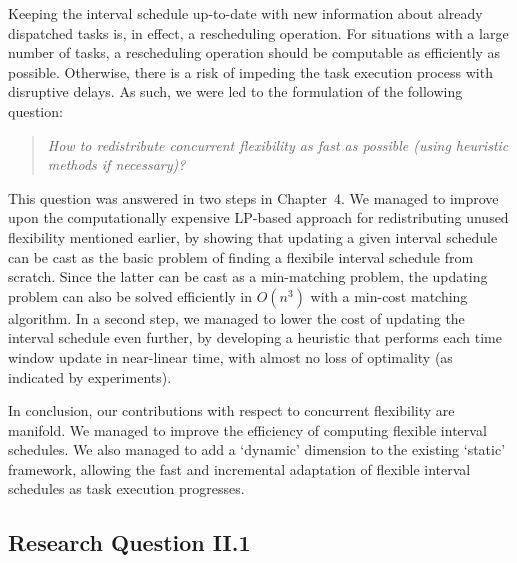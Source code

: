 	Keeping the interval schedule up-to-date with new information about already dispatched tasks is, in effect, a rescheduling operation.
	For situations with a large number of tasks, 
	a rescheduling operation should be computable as efficiently as possible.
	Otherwise, there is a risk of impeding the task execution process with disruptive delays.
	As such, we were led to the formulation of the following question:

	\begin{quote}
	\emph{How to redistribute concurrent flexibility as fast as possible (using heuristic methods if necessary)?}
	\end{quote}

	This question was answered in two steps in Chapter~4.
	We managed to improve upon the computationally expensive LP-based approach for redistributing unused flexibility mentioned earlier,
	by showing that updating a given interval schedule can be cast as the basic problem of finding a flexibile interval schedule from scratch.
	Since the latter can be cast as a min-matching problem, 
	the updating problem can also be solved efficiently in $O(n^3)$ with a min-cost matching algorithm.
	In a second step, we managed to lower the cost of updating the interval schedule even further,
	by developing a heuristic that performs each time window update in near-linear time, 
	with almost no loss of optimality (as indicated by experiments).
	
	In conclusion,
	our contributions with respect to concurrent flexibility are manifold.
	We managed to improve the efficiency of computing flexible interval schedules.
	We also managed to add a `dynamic' dimension to the existing `static' framework,
	allowing the fast and incremental adaptation of flexible interval schedules as task execution progresses.


\subsection{Research Question II.1}


